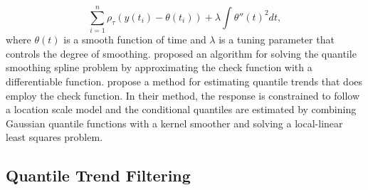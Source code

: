 \documentclass[aoas]{imsart}
\begin{document}
\begin{equation*}
\label{eq:smoothingspline}
\sum_{i=1}^n\rho_{\tau}(y(t_i) - \theta(t_i)) + \lambda\int \theta''(t)^2 dt,
\end{equation*}
where $\theta(t)$ is a smooth function of time and $\lambda$ is a tuning parameter that controls the degree of smoothing. \cite{Oh2011} proposed an algorithm for solving the quantile smoothing spline problem by approximating the check function with a differentiable function. \cite{Racine2017} propose a method for estimating quantile trends that does employ the check function. In their method, the response is constrained to follow a location scale model and the conditional quantiles are estimated by combining Gaussian quantile functions with a kernel smoother and solving a local-linear least squares problem. 


\subsection{Quantile Trend Filtering}
\end{document}
